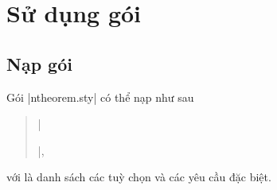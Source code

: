 \documentclass[11pt,oneside]{ltxdoc}
\theoremstyle{marginbreak}
\theoremstyle{changebreak}
\theoremstyle{change}
\theoremstyle{plain}
\theoremstyle{nonumberplain}
\begin{document}

\section{Sử dụng gói}


\subsection{Nạp gói}

Gói |ntheorem.sty| có thể nạp như sau
\begin{quote}
|\usepackage[||]{ntheorem.sty}|,
\end{quote}
với  là danh sách các tuỳ chọn và các yêu cầu đặc biệt.
\end{document}
